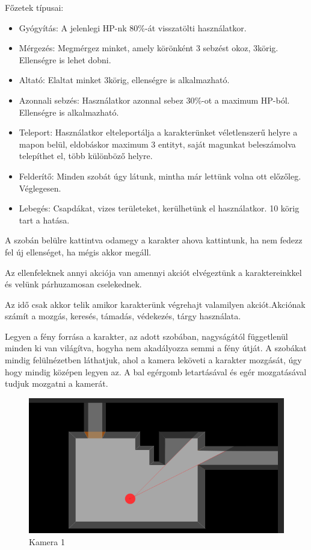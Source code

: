 Főzetek típusai:
\begin{itemize}
\item Gyógyítás: A jelenlegi HP-nk 80\%-át visszatölti használatkor.
\item Mérgezés: Megmérgez minket, amely körönként 3 sebzést okoz, 3körig. Ellenségre is lehet dobni.
\item Altató: Elaltat minket 3körig, ellenségre is alkalmazható.
\item Azonnali sebzés: Használatkor azonnal sebez 30\%-ot a maximum HP-ból. Ellenségre is alkalmazható.
\item Teleport: Használatkor elteleportálja a karakterünket véletlenszerű helyre a mapon belül, eldobáskor maximum 3 entityt, saját magunkat beleszámolva telepíthet el, több különböző helyre.
\item Felderítő: Minden szobát úgy látunk, mintha már lettünk volna ott előzőleg. Véglegesen.
\item Lebegés: Csapdákat, vizes területeket, kerülhetünk el használatkor. 10 körig tart a hatása.
\end{itemize}


A szobán belülre kattintva odamegy a karakter ahova kattintunk, ha nem fedezz fel új ellenséget, ha mégis akkor megáll.

Az ellenfeleknek annyi akciója van amennyi akciót elvégeztünk a karaktereinkkel és velünk párhuzamosan cselekednek.

Az idő csak akkor telik amikor karakterünk végrehajt valamilyen akciót.Akciónak számít a mozgás, keresés, támadás, védekezés, tárgy használata.


Legyen a fény forrása a karakter, az adott szobában, nagyságától függetlenül minden ki van világítva, hogyha nem akadályozza semmi a fény útját.
A szobákat mindig felülnézetben láthatjuk, ahol a kamera leköveti a karakter mozgását, úgy hogy mindig középen legyen az.
A bal egérgomb letartásával és egér mozgatásával tudjuk mozgatni a kamerát.

\begin{figure}[h!]
	\centering
	\includegraphics[scale=1]{images/image6.png}
	\caption{Kamera 1}
	\label{fig:camera1}
\end{figure}

